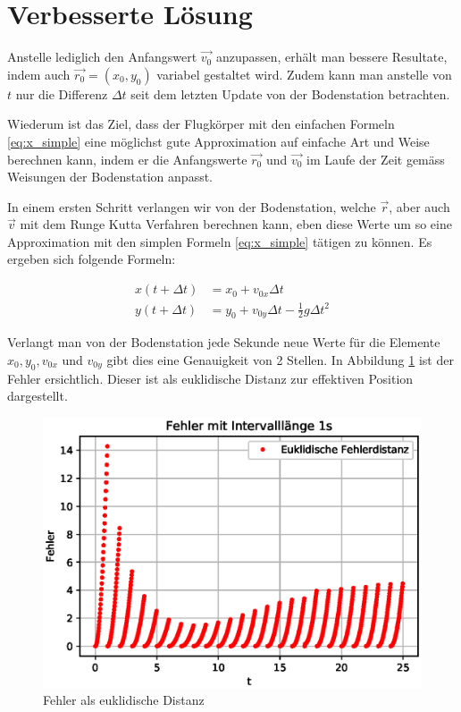 \section{Verbesserte Lösung
\label{perturbation:section:verbesserte_loesung}}

Anstelle lediglich den Anfangswert $\vec{v_0}$ anzupassen, erhält man bessere Resultate, indem auch $\vec{r_0} = (x_0, y_0)$ variabel gestaltet wird. 
Zudem kann man anstelle von $t$ nur die Differenz $\Delta t$ seit dem letzten Update von der Bodenstation betrachten.

Wiederum ist das Ziel, dass der Flugkörper mit den einfachen Formeln \eqref{eq:x_simple} eine möglichst gute Approximation auf einfache Art und Weise berechnen kann, indem er die Anfangswerte $\vec{r_0}$ und $\vec{v_0}$ im Laufe der Zeit gemäss Weisungen der Bodenstation anpasst.

In einem ersten Schritt verlangen wir von der Bodenstation, welche $\vec{r}$, aber auch $\vec{v}$ mit dem Runge Kutta Verfahren berechnen kann, eben diese Werte um so eine Approximation mit den simplen Formeln \eqref{eq:x_simple} tätigen zu können. Es ergeben sich folgende Formeln:

\begin{equation}
\begin{aligned}
x(t + \Delta t) &= x_0 + v_{0x}\Delta t\\
y(t + \Delta t) &= y_0 + v_{0y}\Delta t - \frac{1}{2}g\Delta t^2
\end{aligned}
\end{equation}

Verlangt man von der Bodenstation jede Sekunde neue Werte für die Elemente $x_0, y_0, v_{0x}$ und $v_{0y}$ gibt dies eine Genauigkeit von 2 Stellen. In Abbildung \ref{error} ist der Fehler ersichtlich. Dieser ist als euklidische Distanz zur effektiven Position dargestellt.

\begin{figure}
    \centering
    \includegraphics[scale = 0.7]{papers/perturbation/bilder/perturbation_fig3.eps}
    \caption{Fehler als euklidische Distanz}
	\label{error}
\end{figure}